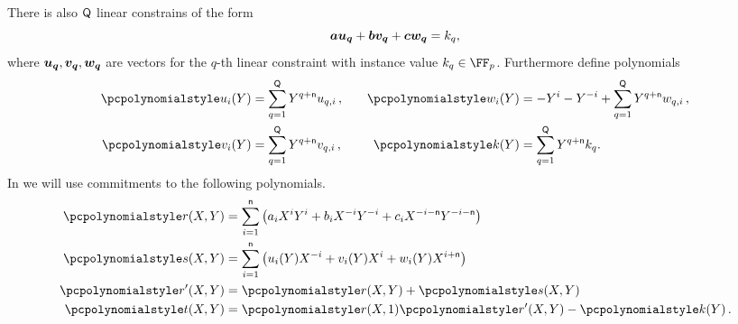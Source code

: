 \let\accentvec\vec \documentclass[runningheads,10pt]{llncs}
\def\vec#1{\mathchoice{\mbox{\boldmath$\displaystyle#1$}}
{\mbox{\boldmath$\textstyle#1$}} {\mbox{\boldmath$\scriptstyle#1$}}
{\mbox{\boldmath$\scriptscriptstyle#1$}}}
\begin{document}
	There is also $\mathsf{Q}$ linear constrains of the form 
	\[
		\va \vec{u_q} + \vb \vec{v_q} + \vc \vec{w_q} = k_q,
	\]
	where $\vec{u_q}, \vec{v_q}, \vec{w_q}$ are vectors for the $q$-th linear
	constraint with instance value $k_q \in \FF_p$. Furthermore define polynomials
\begin{equation}
	\begin{split}
		\p{u_i}(Y) & = \sum_{q = 1}^\linconstr Y^{q + \multconstr} u_{q, i}\,,\\
		\p{v_i}(Y) & = \sum_{q = 1}^\linconstr Y^{q + \multconstr} v_{q, i}\,,\\
	\end{split}
	\qquad
	\begin{split}
		\p{w_i}(Y) & = -Y^i - Y^{-i}  + \sum_{q = 1}^\linconstr Y^{q +
		\multconstr} w_{q, i}\,,\\
		\p{k}(Y) & = \sum_{q = 1}^\linconstr Y^{q + \multconstr} k_{q}.
	\end{split}
\end{equation}
In \sonic{} we will use commitments to the following polynomials.
\begin{align*}
	\pr(X, Y) & = \sum_{i = 1}^{\multconstr} \left(a_i X^i Y^i + b_i X^{-i} Y^{-i}
	+ c_i X^{-i - \multconstr} Y^{-i - \multconstr}\right) \\
	\p{s}(X, Y) & = \sum_{i = 1}^{\multconstr} \left( u_i (Y) X^{-i} +
	v_i(Y) X^i + w_i(Y) X^{i + \multconstr}\right)\\
		\pr'(X, Y) & = \pr(X, Y) + \p{s}(X, Y) \\
		\pt(X, Y) & = \pr(X, 1) \pr'(X, Y) - \p{k}(Y)\,.
\end{align*}
	
\end{document}
